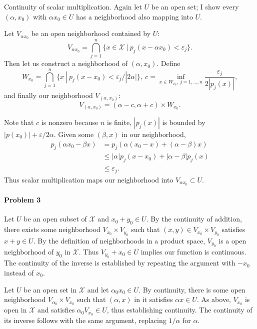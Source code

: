 \documentclass[12pt]{article}
\newcommand{\X}{\mathcal{X}}
\begin{document}
Continuity of scalar multiplication. Again let $U$ be an open set; I show every
$(\alpha, x_0)$ with $\alpha x_0\in U$ has a neighborhood also mapping into $U$.

Let $V_{\alpha x_0}$ be an open neighborhood contained by $U$:
\begin{displaymath}
  V_{\alpha x_0} = \bigcap_{j=1}^n \{x\in\X\ |\ p_j(x-\alpha x_0) < \varepsilon_j\}.
\end{displaymath}
Then let us construct a neighborhood of $(\alpha, x_0)$. Define
\begin{displaymath}
  W_{x_0} = \bigcap_{j=1}^n\{x\ |\ p_j(x-x_0) < \varepsilon_j/|2\alpha|\},\ 
  c = \inf_{x\in W_{x_0},\ j = 1,\ldots ,n} \frac{\varepsilon_j}{2|p_j(x)|},
\end{displaymath}
and finally our neighborhood $V_{(\alpha, x_0)}$:
\begin{displaymath}
  V_{(\alpha, x_0)} = (\alpha - c, \alpha + c)\times W_{x_0}.
\end{displaymath}

Note that $c$ is nonzero because $n$ is finite, $|p_j(x)|$ is bounded by
$|p(x_0)| + \varepsilon/2\alpha$. Given some $(\beta, x)$ in our neighborhood,
\begin{align*}
  p_j(\alpha x_0 - \beta x)
  & = p_j(\alpha(x_0-x) + (\alpha - \beta)x)\\
  & \leq |\alpha|p_j(x-x_0) + |\alpha -\beta|p_j(x)\\
  & \leq \varepsilon_j.
\end{align*}
Thus scalar multiplication maps our neighborhood into $V_{\alpha x_0}\subset U$.

\paragraph{Problem 3}

Let $U$ be an open subset of $\X$ and $x_0+y_0 \in U$. By the continuity of
addition, there exists some neighborhood $V_{x_0}\times V_{y_0}$ such that
$(x,y)\in V_{x_0}\times V_{y_0}$ satisfies $x + y \in U$. By the definition of
neighborhoods in a product space, $V_{y_0}$ is a open neighborhood of $y_0$
in $\X$. Thus $V_{y_0} + x_0 \in U$ implies our function is continuous.
The continuity of the inverse is established by repeating the argument with
$-x_0$ instead of $x_0$.

Let $U$ be an open set in $\X$ and let $\alpha_0 x_0 \in U$. By continuity, there
is some open neighborhood $V_{\alpha_0}\times V_{x_0}$ such that $(\alpha,x)$ in
it satisfies $\alpha x \in U$. As above, $V_{x_0}$ is open in $\X$ and satisfies
$\alpha_0V_{x_0} \in U$, thus establishing continuity. The continuity of its
inverse follows with the same argument, replacing $1/\alpha$ for $\alpha$.
\end{document}
